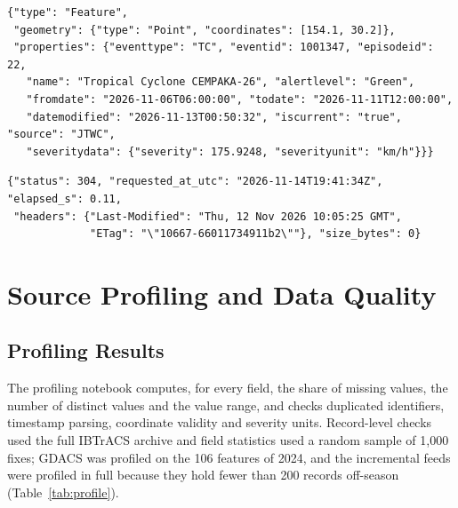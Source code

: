 \documentclass[10pt,twocolumn,letterpaper]{article}
\begin{document}
\begin{lstlisting}[caption={S4, one GDACS feature (selected properties)},label=lst:s4]
{"type": "Feature",
 "geometry": {"type": "Point", "coordinates": [154.1, 30.2]},
 "properties": {"eventtype": "TC", "eventid": 1001347, "episodeid": 22,
   "name": "Tropical Cyclone CEMPAKA-26", "alertlevel": "Green",
   "fromdate": "2026-11-06T06:00:00", "todate": "2026-11-11T12:00:00",
   "datemodified": "2026-11-13T00:50:32", "iscurrent": "true", "source": "JTWC",
   "severitydata": {"severity": 175.9248, "severityunit": "km/h"}}}
\end{lstlisting}

\begin{lstlisting}[caption={S3, conditional request of the second poll (client metadata)},label=lst:s3]
{"status": 304, "requested_at_utc": "2026-11-14T19:41:34Z", "elapsed_s": 0.11,
 "headers": {"Last-Modified": "Thu, 12 Nov 2026 10:05:25 GMT",
             "ETag": "\"10667-66011734911b2\""}, "size_bytes": 0}
\end{lstlisting}

\section{Source Profiling and Data Quality}\label{sec:profiling}

\subsection{Profiling Results}
The profiling notebook computes, for every field, the share of missing values, the number of distinct values and the value range, and checks duplicated identifiers, timestamp parsing, coordinate validity and severity units. Record-level checks used the full IBTrACS archive and field statistics used a random sample of 1{,}000 fixes; GDACS was profiled on the 106 features of 2024, and the incremental feeds were profiled in full because they hold fewer than 200 records off-season (Table~\ref{tab:profile}).
\end{document}
